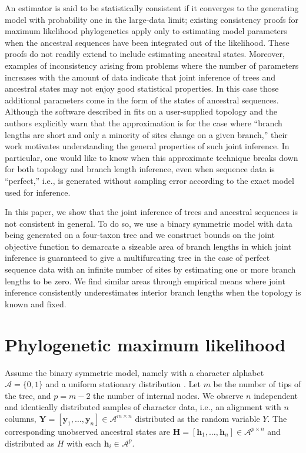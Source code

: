 \documentclass[11pt]{article}
\newcommand{\alphabet}{\mathcal{A}}
\newcommand{\fullAlignment}{\mathbf{Y}}
\newcommand{\alignmentColumn}{\mathbf{y}}
\newcommand{\alignmentColumnRV}{Y}
\newcommand{\fullAncestralStates}{\mathbf{H}}
\newcommand{\ancestralStateColumn}{\mathbf{h}}
\newcommand{\ancestralStateColumnRV}{H}
\newcommand{\nCols}{n}
\newcommand{\nSiteRows}{m}
\newcommand{\nAncestralStateRows}{p}
\begin{document}
An estimator is said to be statistically consistent if it converges to the generating model with probability one in the large-data limit; existing consistency proofs for maximum likelihood phylogenetics \citep{Allman2008-wd,Chai2011-ff,RoyChoudhury2015-ta} apply only to estimating model parameters when the ancestral sequences have been integrated out of the likelihood.
These proofs do not readily extend to include estimating ancestral states.
Moreover, examples of inconsistency arising from problems where the number of parameters increases with the amount of data \citep{Neyman1948-tt} indicate that joint inference of trees and ancestral states may not enjoy good statistical properties.
In this case those additional parameters come in the form of the states of ancestral sequences.
Although the software described in \citet{Sagulenko2018-xl} fits on a user-supplied topology and the authors explicitly warn that the approximation is for the case where ``branch lengths are short and only a minority of sites change on a given branch,'' their work motivates understanding the general properties of such joint inference.
In particular, one would like to know when this approximate technique breaks down for both topology and branch length inference, even when sequence data is ``perfect,'' i.e., is generated without sampling error according to the exact model used for inference.

In this paper, we show that the joint inference of trees and ancestral sequences is not consistent in general.
To do so, we use a binary symmetric model with data being generated on a four-taxon tree and we construct bounds on the joint objective function to demarcate a sizeable area of branch lengths in which joint inference is guaranteed to give a multifurcating tree in the case of perfect sequence data with an infinite number of sites by estimating one or more branch lengths to be zero.
We find similar areas through empirical means where joint inference consistently underestimates interior branch lengths when the topology is known and fixed.

\section*{Phylogenetic maximum likelihood}

Assume the binary symmetric model, namely with a character alphabet $\alphabet=\{0,1\}$ and a uniform stationary distribution \citep{Semple2003-em}.
Let $\nSiteRows$ be the number of tips of the tree, and $\nAncestralStateRows = \nSiteRows-2$ the number of internal nodes.
We observe $\nCols$ independent and identically distributed samples of character data, i.e., an alignment with $\nCols$ columns, $\fullAlignment=[\alignmentColumn_1,\ldots,\alignmentColumn_\nCols]\in\alphabet^{\nSiteRows\times\nCols}$ distributed as the random variable $\alignmentColumnRV$.
The corresponding unobserved ancestral states are $\fullAncestralStates=[\ancestralStateColumn_1,\ldots,\ancestralStateColumn_\nCols]\in\alphabet^{\nAncestralStateRows\times\nCols}$ and distributed as $\ancestralStateColumnRV$ with each $\ancestralStateColumn_i\in\alphabet^\nAncestralStateRows$.
\end{document}
